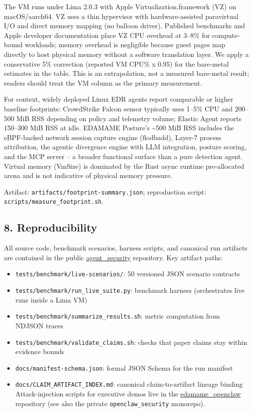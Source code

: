 \documentclass[
]{article}
\providecommand{\tightlist}{%
  \setlength{\itemsep}{0pt}\setlength{\parskip}{0pt}}
\begin{document}
The VM runs under Lima 2.0.3 with Apple Virtualization.framework (VZ) on
macOS/aarch64. VZ uses a thin hypervisor with hardware-assisted
paravirtual I/O and direct memory mapping (no balloon driver). Published
benchmarks and Apple developer documentation place VZ CPU overhead at
3--8\% for compute-bound workloads; memory overhead is negligible
because guest pages map directly to host physical memory without a
software translation layer. We apply a conservative 5\% correction
(reported VM CPU\% x 0.95) for the bare-metal estimates in the table.
This is an extrapolation, not a measured bare-metal result; readers
should treat the VM column as the primary measurement.

For context, widely deployed Linux EDR agents report comparable or
higher baseline footprints: CrowdStrike Falcon sensor typically uses
1--5\% CPU and 200--500 MiB RSS depending on policy and telemetry
volume; Elastic Agent reports 150--300 MiB RSS at idle. EDAMAME
Posture's \textasciitilde500 MiB RSS includes the eBPF-backed network
session capture engine (flodbadd), Layer-7 process attribution, the
agentic divergence engine with LLM integration, posture scoring, and the
MCP server -- a broader functional surface than a pure detection agent.
Virtual memory (VmSize) is dominated by the Rust async runtime
pre-allocated arena and is not indicative of physical memory pressure.

Artifact: \texttt{artifacts/footprint-summary.json}; reproduction
script: \texttt{scripts/measure\_footprint.sh}.

\subsection{8. Reproducibility}\label{reproducibility}

All source code, benchmark scenarios, harness scripts, and canonical run
artifacts are contained in the public
\href{https://github.com/edamametechnologies/agent_security}{agent\_security}
repository. Key artifact paths:

\begin{itemize}
\tightlist
\item
  \texttt{tests/benchmark/live-scenarios/}: 50 versioned JSON scenario
  contracts
\item
  \texttt{tests/benchmark/run\_live\_suite.py}: benchmark harness
  (orchestrates live runs inside a Lima VM)
\item
  \texttt{tests/benchmark/summarize\_results.sh}: metric computation
  from NDJSON traces
\item
  \texttt{tests/benchmark/validate\_claims.sh}: checks that paper claims
  stay within evidence bounds
\item
  \texttt{docs/manifest-schema.json}: formal JSON Schema for the run
  manifest
\item
  \texttt{docs/CLAIM\_ARTIFACT\_INDEX.md}: canonical claim-to-artifact
  lineage binding Attack-injection scripts for executive demos live in
  the
  \href{https://github.com/edamametechnologies/edamame_openclaw}{edamame\_openclaw}
  repository (see also the private \texttt{openclaw\_security}
  monorepo).
\end{itemize}
\end{document}
